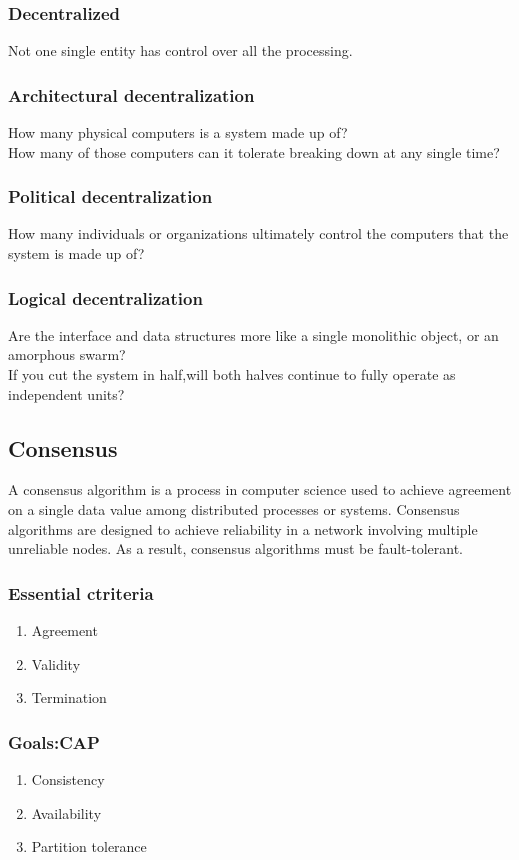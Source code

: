 \documentclass[]{article}
\begin{document}
	\subsubsection{\textbf{Decentralized}}
	Not one single entity has control over all the processing.
	
	\subsubsection{Architectural decentralization} 
	How many physical computers is a system made up of?\\ 
	How many of those computers can it tolerate breaking down at any single time?\\
	\subsubsection{Political decentralization} 
	How many individuals or organizations ultimately control the computers that the system is made up of?\\
	\subsubsection{Logical decentralization} 
	Are the interface and data structures more like a single monolithic object, or an amorphous swarm? \\
	If you cut the system in half,will both halves continue to fully operate as independent units?

	\subsection{Consensus}
	 A consensus algorithm is a process in computer science used to achieve agreement on a single data value among distributed processes or systems. Consensus algorithms are designed to achieve reliability in a network involving multiple unreliable nodes. As a result, consensus algorithms must be fault-tolerant.
	\subsubsection{Essential ctriteria}
	\begin{enumerate} 
	\item Agreement
	\item Validity 
	\item Termination
	\end{enumerate}
	\subsubsection{Goals:CAP}
	\begin{enumerate}  
	\item Consistency
	\item Availability	
	\item Partition tolerance
	\end{enumerate}
\end{document}
